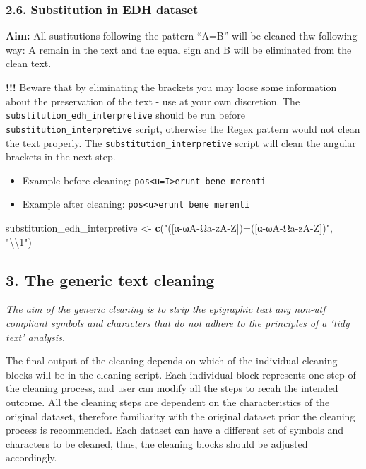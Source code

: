 \documentclass[]{article}
\newenvironment{Shaded}{\begin{snugshade}}{\end{snugshade}}
\newcommand{\CharTok}[1]{\textcolor[rgb]{0.31,0.60,0.02}{#1}}
\newcommand{\KeywordTok}[1]{\textcolor[rgb]{0.13,0.29,0.53}{\textbf{#1}}}
\newcommand{\NormalTok}[1]{#1}
\newcommand{\StringTok}[1]{\textcolor[rgb]{0.31,0.60,0.02}{#1}}
\providecommand{\tightlist}{%
  \setlength{\itemsep}{0pt}\setlength{\parskip}{0pt}}
\begin{document}
\hypertarget{substitution-in-edh-dataset-1}{%
\subsubsection{2.6. Substitution in EDH
dataset}\label{substitution-in-edh-dataset-1}}

\textbf{Aim:} All sustitutions following the pattern ``A=B'' will be
cleaned thw following way: A remain in the text and the equal sign and B
will be eliminated from the clean text.

\textbf{!!!} Beware that by eliminating the brackets you may loose some
information about the preservation of the text - use at your own
discretion. The \texttt{substitution\_edh\_interpretive} should be run
before \texttt{substitution\_interpretive} script, otherwise the Regex
pattern would not clean the text properly. The
\texttt{substitution\_interpretive} script will clean the angular
brackets in the next step.

\begin{itemize}
\tightlist
\item
  Example before cleaning:
  \texttt{pos\textless{}u=I\textgreater{}erunt\ bene\ merenti}
\item
  Example after cleaning:
  \texttt{pos\textless{}u\textgreater{}erunt\ bene\ merenti}
\end{itemize}

\begin{Shaded}
\begin{Highlighting}[]
\NormalTok{substitution_edh_interpretive <-}\StringTok{ }\KeywordTok{c}\NormalTok{(}\StringTok{"([α-ωΑ-Ωa-zA-Z])=([α-ωΑ-Ωa-zA-Z])"}\NormalTok{, }\StringTok{"}\CharTok{\textbackslash{}\textbackslash{}}\StringTok{1"}\NormalTok{)}
\end{Highlighting}
\end{Shaded}

\hypertarget{the-generic-text-cleaning}{%
\subsection{3. The generic text
cleaning}\label{the-generic-text-cleaning}}

\emph{The aim of the generic cleaning is to strip the epigraphic text
any non-utf compliant symbols and characters that do not adhere to the
principles of a `tidy text' analysis.}

The final output of the cleaning depends on which of the individual
cleaning blocks will be in the cleaning script. Each individual block
represents one step of the cleaning process, and user can modify all the
steps to recah the intended outcome. All the cleaning steps are
dependent on the characteristics of the original dataset, therefore
familiarity with the original dataset prior the cleaning process is
recommended. Each dataset can have a different set of symbols and
characters to be cleaned, thus, the cleaning blocks should be adjusted
accordingly.
\end{document}
